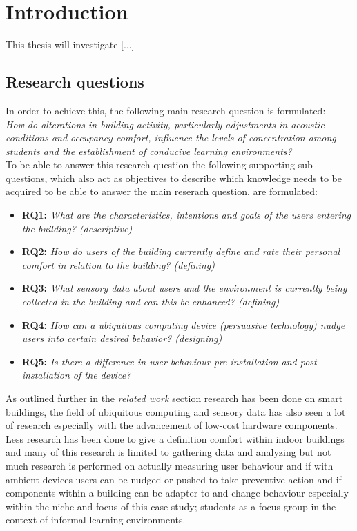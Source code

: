 \section{Introduction}

This thesis will investigate [...] 

\subsection{Research questions}

In order to achieve this, the following main research question is formulated: \\

\emph{How do alterations in building activity, particularly adjustments in acoustic conditions and occupancy comfort, influence the levels of concentration among students and the establishment of conducive learning environments?} \\

To be able to answer this research question the following supporting sub-questions, which also act as objectives to describe which knowledge needs to be acquired to be able to answer the main reserach question, are formulated:

\begin{itemize}
    \item \textbf{RQ1:} \emph{What are the characteristics, intentions and goals of the users entering the building? (descriptive)}
    \item \textbf{RQ2:} \emph{How do users of the building currently define and rate their personal comfort in relation to the building? (defining)}
    \item \textbf{RQ3:} \emph{What sensory data about users and the environment is currently being collected in the building and can this be enhanced? (defining)}
    \item \textbf{RQ4:} \emph{How can a ubiquitous computing device (persuasive technology) nudge users into certain desired behavior? (designing)}
    \item \textbf{RQ5:} \emph{Is there a difference in user-behaviour pre-installation and post-installation of the device?}
\end{itemize}

As outlined further in the \emph{related work} section research has been done on smart buildings, the field of ubiquitous computing and sensory data has also seen a lot of research especially with the advancement of low-cost hardware components. Less research has been done to give a definition comfort within indoor buildings and many of this research is limited to gathering data and analyzing but not much research is performed on actually measuring user behaviour and if with ambient devices users can be nudged or pushed to take preventive action and if components within a building can be adapter to and change behaviour especially within the niche and focus of this case study; students as a focus group in the context of informal learning environments.

